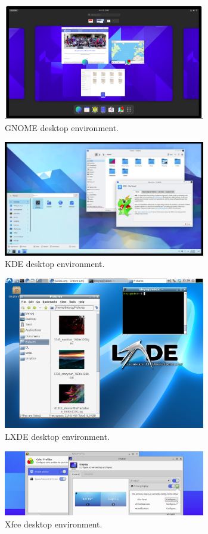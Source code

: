 \begin{figure}[!htb]
	\centering
	\includegraphics[width=250pt]{chapters/part-1/figures/gnome_demo.png}
	\caption{GNOME desktop environment.} \label{ch:bitl:fig:gnomedemo}
\end{figure}

\begin{figure}[!htb]
	\centering
	\includegraphics[width=250pt]{chapters/part-1/figures/kde_demo.png}
	\caption{KDE desktop environment.} \label{ch:bitl:fig:kdedemo}
\end{figure}

\begin{figure}[!htb]
	\centering
	\includegraphics[width=250pt]{chapters/part-1/figures/lxde_demo.png}
	\caption{LXDE desktop environment.} \label{ch:bitl:fig:lxdedemo}
\end{figure}

\begin{figure}[!htb]
	\centering
	\includegraphics[width=250pt]{chapters/part-1/figures/xfce_demo.png}
	\caption{Xfce desktop environment.} \label{ch:bitl:fig:xfcedemo}
\end{figure}

